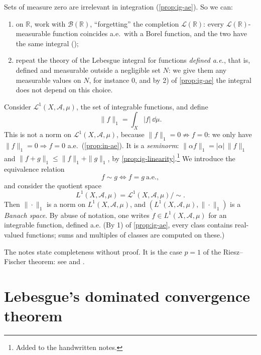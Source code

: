 \begin{remark}\label{rem:ig-null-sets}
Sets of measure zero are irrelevant in integration (\cref{prop:ig-ae}). So we can:
\begin{enumerate}[label=\arabic*)]
  \item on $\mathbb R$, work with $\mathcal B(\mathbb R)$, ``forgetting'' the completion
    $\mathcal L(\mathbb R)$: every $\mathcal L(\mathbb R)$-measurable function coincides a.e.\
    with a Borel function, and the two have the same integral ();
  \item repeat the theory of the Lebesgue integral for functions \emph{defined a.e.}, that is,
    defined and measurable outside a negligible set $N$: we give them any measurable values on
    $N$, for instance $0$, and by 2) of \cref{prop:ig-ae} the integral does not depend on this
    choice.
\end{enumerate}
\end{remark}

\begin{remark}\label{rem:ig-L1}
Consider $\mathcal L^1(X,\mathcal A,\mu)$, the set of integrable functions, and define
\[
  \|f\|_1=\int_X|f|\,\dd\mu .
\]
This is not a norm on $\mathcal L^1(X,\mathcal A,\mu)$, because $\|f\|_1=0\not\Rightarrow f=0$:
we only have $\|f\|_1=0\Rightarrow f=0$ a.e.\ (\cref{prop:in-ae}). It is a \emph{seminorm}:
$\|\alpha f\|_1=|\alpha|\,\|f\|_1$ and $\|f+g\|_1\le\|f\|_1+\|g\|_1$, by
\cref{prop:ig-linearity}.\footnote{Added to the handwritten notes.} We introduce the equivalence relation
\[
  f\sim g\iff f=g\ \text{a.e.},
\]
and consider the quotient space
\[
  L^1(X,\mathcal A,\mu)=\mathcal L^1(X,\mathcal A,\mu)/\!\sim .
\]
Then $\|\cdot\|_1$ is a norm on $L^1(X,\mathcal A,\mu)$, and $(L^1(X,\mathcal A,\mu),\|\cdot\|_1)$
is a \emph{Banach space}. By abuse of notation, one writes $f\in L^1(X,\mathcal A,\mu)$ for an
integrable function, defined a.e. (By 1) of \cref{prop:ig-ae}, every class contains
real-valued functions; sums and multiples of classes are computed on these.)

The notes state completeness without proof. It is the case $p=1$ of the Riesz--Fischer theorem:
see \citet[Chapter~3]{rudin-rca} and \citet[Section~19]{billingsley}.
\end{remark}

\section{Lebesgue's dominated convergence theorem}\label{sec:ig-dominated}

